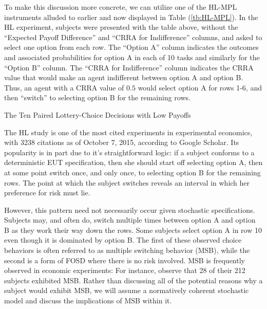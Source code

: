 \documentclass[../main.tex]{subfiles}
\begin{document}
To make this discussion more concrete, we can utilize one of the HL-MPL instruments alluded to earlier and now displayed in Table (\ref{tb:HL-MPL}).
In the HL experiment, subjects were presented with the table above, without the \enquote{Expected Payoff Difference} and \enquote{CRRA for Indifference} columns, and asked to select one option from each row.
The \enquote{Option A} column indicates the outcomes and associated probabilities for option A in each of 10 tasks and similarly for the \enquote{Option B} column.
The \enquote{CRRA for Indifference} column indicates the CRRA value that would make an agent indifferent between option A and option B.
Thus, an agent with a CRRA value of $0.5$ would select option A for rows 1-6, and then \enquote{switch} to selecting option B for the remaining rows.

\begin{table}[ht]
	\centering
	\captionsetup{justification=centering}
	\caption{The Ten Paired Lottery-Choice Decisions with Low Payoffs \newline \textcite[1645]{Holt2002} }
	\label{tb:HL-MPL}
	\begin{adjustbox}{width=1\textwidth}
	\end{adjustbox}
\end{table}

The HL study is one of the most cited experiments in experimental economics, with 3238 citations as of October 7, 2015, according to Google Scholar.
Its popularity is in part due to it's straightforward logic: if a subject conforms to a deterministic EUT specification, then she should start off selecting option A, then at some point switch once, and only once, to selecting option B for the remaining rows.
The point at which the subject switches reveals an interval in which her preference for risk must lie.

However, this pattern need not necessarily occur given stochastic specifications.
Subjects may, and often do, switch multiple times between option A and option B as they work their way down the rows.
Some subjects select option A in row 10 even though it is dominated by option B.
The first of these observed choice behaviors is often referred to as multiple switching behavior (MSB), while the second is a form of FOSD where there is no risk involved.
MSB is frequently observed in economic experiments: For instance, \textcite[1647]{Holt2002} observe that 28 of their 212 subjects exhibited MSB.
Rather than discussing all of the potential reasons why a subject would exhibit MSB, we will assume a normatively coherent stochastic model and discuss the implications of MSB within it.
\end{document}
